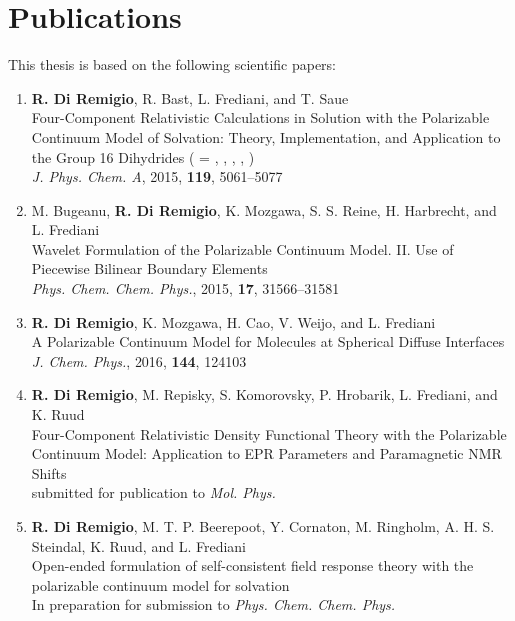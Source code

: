 \thispagestyle{empty}
\chapter*{Publications}

This thesis is based on the following scientific papers:

\begin{enumerate}[label=\textbf{\Roman{*} }, ref=\Roman{*}]

\item
  \textbf{R. Di Remigio}, R. Bast, L. Frediani, and T. Saue
  \\
  Four-Component Relativistic Calculations in Solution with the
  Polarizable Continuum Model of Solvation: Theory,
  Implementation, and Application to the Group 16 Dihydrides
   ( = , , , ,
  )
  \\
\textit{J. Phys. Chem. A}, \textrm{2015}, \textbf{119}, 5061--5077
\label{relapcm}

\item
  M. Bugeanu, \textbf{R. Di Remigio}, K. Mozgawa, S. S. Reine, H.
  Harbrecht,  and L. Frediani
  \\
  Wavelet Formulation of the Polarizable Continuum Model. II. Use of
  Piecewise Bilinear Boundary Elements
  \\
  \textit{Phys. Chem. Chem. Phys.}, \textrm{2015}, \textbf{17},
  31566--31581
\label{wemlin}

\item
  \textbf{R. Di Remigio}, K. Mozgawa, H. Cao, V. Weijo, and L.
  Frediani
  \\
  A Polarizable Continuum Model for Molecules at Spherical
  Diffuse Interfaces
  \\
  \textit{J. Chem. Phys.}, \textrm{2016}, \textbf{144}, 124103
\label{spherical}

\item
  \textbf{R. Di Remigio}, M. Repisky, S. Komorovsky, P. Hrobarik, L.
  Frediani, and K. Ruud
  \\
  Four-Component Relativistic Density Functional Theory with the
  Polarizable Continuum Model: Application to EPR Parameters
  and Paramagnetic NMR Shifts
  \\
  submitted for publication to \textit{Mol. Phys.}
\label{pcmepr}

\item
  \textbf{R. Di Remigio}, M. T. P. Beerepoot, Y. Cornaton, M. Ringholm,
  A. H. S. Steindal, K. Ruud, and L. Frediani
  \\
  Open-ended formulation of self-consistent field response theory with
  the polarizable continuum model for solvation
  \\
  In preparation for submission to \textit{Phys. Chem. Chem. Phys.}
\label{pcmopenrsp}
\end{enumerate}
